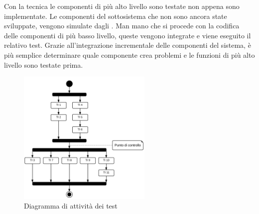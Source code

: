 	Con la tecnica  le componenti di più alto livello sono testate non appena sono implementate. Le componenti del sottosistema che non sono ancora state sviluppate, vengono simulate dagli . Man mano che si procede con la codifica delle componenti di più basso livello, queste vengono integrate e viene eseguito il relativo test. Grazie all'integrazione incrementale delle componenti del sistema, è più semplice determinare quale componente crea problemi e le funzioni di più alto livello sono testate prima.

	\begin{figure}[H]
	\centering \includegraphics[width=0.57\textwidth]{sequenza-dei-test.png}
	\caption{Diagramma di attività dei test}
	\label{fig:sequenza-dei-test}
	\end{figure}
	
